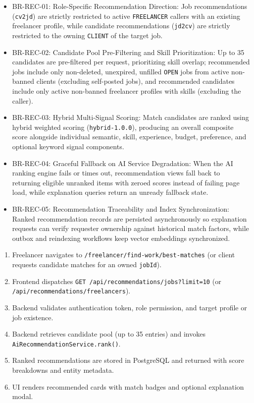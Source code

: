 \begin{itemize}[leftmargin=1.6em,topsep=3pt,itemsep=2pt,parsep=0pt,label=$\bullet$]\brrulelist
    \item BR-REC-01: Role-Specific Recommendation Direction: Job recommendations (\texttt{cv2jd}) are strictly restricted to active \texttt{FREELANCER} callers with an existing freelancer profile, while candidate recommendations (\texttt{jd2cv}) are strictly restricted to the owning \texttt{CLIENT} of the target job.
    \item BR-REC-02: Candidate Pool Pre-Filtering and Skill Prioritization: Up to 35 candidates are pre-filtered per request, prioritizing skill overlap; recommended jobs include only non-deleted, unexpired, unfilled \texttt{OPEN} jobs from active non-banned clients (excluding self-posted jobs), and recommended candidates include only active non-banned freelancer profiles with skills (excluding the caller).
    \item BR-REC-03: Hybrid Multi-Signal Scoring: Match candidates are ranked using hybrid weighted scoring (\texttt{hybrid-1.0.0}), producing an overall composite score alongside individual semantic, skill, experience, budget, preference, and optional keyword signal components.
    \item BR-REC-04: Graceful Fallback on AI Service Degradation: When the AI ranking engine fails or times out, recommendation views fall back to returning eligible unranked items with zeroed scores instead of failing page load, while explanation queries return an unready fallback state.
    \item BR-REC-05: Recommendation Traceability and Index Synchronization: Ranked recommendation records are persisted asynchronously so explanation requests can verify requester ownership against historical match factors, while outbox and reindexing workflows keep vector embeddings synchronized.
\end{itemize}

\begin{enumerate}[leftmargin=1.8em,topsep=3pt,itemsep=2pt,parsep=0pt]
    \item Freelancer navigates to \texttt{/freelancer/find-work/best-matches} (or client requests candidate matches for an owned \texttt{jobId}).
    \item Frontend dispatches \texttt{GET /api/recommendations/jobs?limit=10} (or \texttt{/api/recommendations/freelancers}).
    \item Backend validates authentication token, role permission, and target profile or job existence.
    \item Backend retrieves candidate pool (up to 35 entries) and invokes \texttt{Ai\allowbreak{}Recommendation\allowbreak{}Service.\allowbreak{}rank()}.
    \item Ranked recommendations are stored in PostgreSQL and returned with score breakdowns and entity metadata.
    \item UI renders recommended cards with match badges and optional explanation modal.
\end{enumerate}

